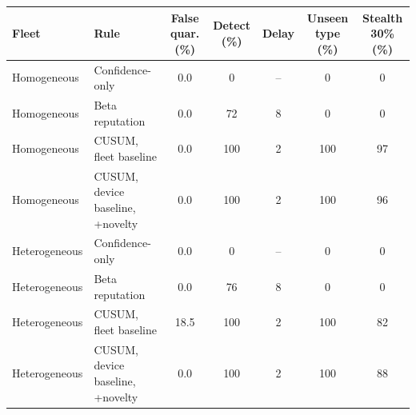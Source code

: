 \begin{tabular}{llccccc}
\toprule
Fleet & Rule & False quar. (\%) & Detect (\%) & Delay & Unseen type (\%) & Stealth 30\% (\%) \\
\midrule
Homogeneous & Confidence-only & 0.0 & 0 & -- & 0 & 0 \\
Homogeneous & Beta reputation & 0.0 & 72 & 8 & 0 & 0 \\
Homogeneous & CUSUM, fleet baseline & 0.0 & 100 & 2 & 100 & 97 \\
Homogeneous & CUSUM, device baseline, +novelty & 0.0 & 100 & 2 & 100 & 96 \\
Heterogeneous & Confidence-only & 0.0 & 0 & -- & 0 & 0 \\
Heterogeneous & Beta reputation & 0.0 & 76 & 8 & 0 & 0 \\
Heterogeneous & CUSUM, fleet baseline & 18.5 & 100 & 2 & 100 & 82 \\
Heterogeneous & CUSUM, device baseline, +novelty & 0.0 & 100 & 2 & 100 & 88 \\
\bottomrule
\end{tabular}
